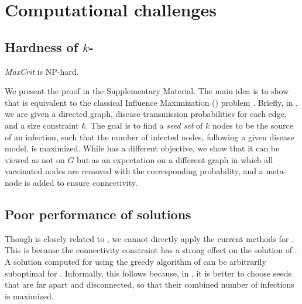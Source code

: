 

\section{Computational challenges}
\label{sec:computational-challenges}

\subsection{Hardness of $k$-\maxcrit{}}

\begin{theorem}
\label{theorem:nphard}
\emph{MaxCrit} is NP-hard.
\end{theorem}

We present the proof in the Supplementary Material. The main idea is to show that \maxcrit{} is equivalent to
the classical Influence Maximization (\infmax) problem \cite{kempe:sigkdd03}. Briefly, in \infmax, we are given a directed graph, disease transmission probabilities for each edge, and a size constraint $k$. The goal is to find a \emph{seed set} of $k$ nodes to be the source of an infection, such that the number of infected nodes, following a given disease model, is maximized. 
While \maxcrit{} has a different objective, we show that it can be viewed as \infmax{} not on $G$ but as an expectation on a
different graph in which all vaccinated nodes are removed with the corresponding probability,
and a meta-node is added to ensure connectivity. 


\subsection{Poor performance of \infmax{} solutions}

Though \maxcrit{} is closely related to \infmax, we cannot directly apply the current methods for 
\infmax{}. This is because the connectivity constraint has a strong effect on the solution of \maxcrit{}. A solution computed for \infmax{} using the greedy algorithm of \cite{kempe:sigkdd03} can be arbitrarily suboptimal for \maxcrit{}. Informally, this follows because, in \infmax{}, it is better to choose seeds that are far apart and disconnected, so that their combined number of infections is maximized.

